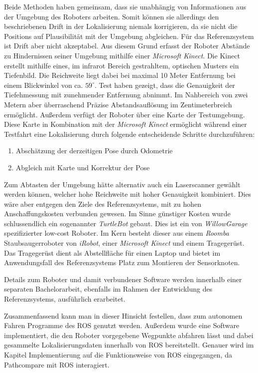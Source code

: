 Beide Methoden haben gemeinsam, dass sie unabhängig von Informationen aus der
Umgebung des Roboters arbeiten. Somit können sie allerdings den beschriebenen
Drift in der Lokalisierung niemals korrigieren, da sie nicht die Positions auf
Plausibilität mit der Umgebung abgleichen.  Für das Referenzsystem ist Drift
aber nicht akzeptabel. Aus diesem Grund erfasst der Roboter Abstände zu
Hindernissen seiner Umgebung mithilfe einer \textit{Microsoft Kinect}. Die
Kinect erstellt mithilfe eines, im infrarot Bereich gestrahltem, optischen
Musters ein Tiefenbild.  Die Reichweite liegt dabei bei maximal 10 Meter
Entfernung bei einem Blickwinkel von ca. $59^{\circ}$.
Test haben gezeigt, dass die Genauigkeit der Tiefehmessung mit zunehmender
Entfernung abnimmt. Im Nahbereich von zwei Metern aber überraschend Präzise
Abstandsauflösung im Zentimeterbreich ermöglicht.  Außerdem verfügt der Roboter
über eine Karte der Testumgebung. Diese Karte in Kombination mit der
\textit{Microsoft Kinect} ermöglicht während einer Testfahrt eine Lokalisierung
durch folgende entscheidende Schritte durchzuführen:

\begin{enumerate}
  \item Abschätzung der derzeitigen Pose durch Odometrie
  \item Abgleich mit Karte und Korrektur der Pose
\end{enumerate}

Zum Abtasten der Umgebung hätte alternativ auch ein Laserscanner gewählt werden
können, welcher hohe Reichweite mit hoher Genauigkeit kombiniert. Dies wäre
aber entgegen den Ziele des Referenzsystems, mit zu hohen Anschaffungskosten
verbunden gewesen. Im Sinne günstiger Kosten wurde schlussendlich ein
sogenannter \textit{TurtleBot} gebaut. Dies ist ein von \textit{WillowGarage}
spezifizierter low-cost Roboter.
Im Kern besteht dieser aus einem \textit{Roomba} Staubsaugerroboter von \textit{iRobot}, 
einer \textit{Microsoft Kinect} und einem Tragegerüst. Das Tragegerüst dient als
Abstellfläche für einen Laptop und bietet im Anwendungsfall des Referenzsystems
Platz zum Montieren der Sensorknoten.

Details zum Roboter und damit verbundener Software werden 
innerhalb einer separaten Bachelorarbeit, ebenfalls im Rahmen der
Entwicklung des Referenzsystems, ausführlich erarbeitet.

Zusammenfassend kann man in dieser Hinsicht festellen, dass zum autonomen Fahren
Programme des \gls{ROS} genutzt werden. Außerdem wurde eine Software implementiert,
die den Roboter vorgegebene Wegpunkte abfahren lässt und dabei gesammelte
Lokalisierungsdaten innerhalb von \gls{ROS} bereitstellt. Genauer wird im
Kapitel Implementierung auf die Funktionsweise von \gls{ROS} eingegangen, da
Pathcompare mit ROS interagiert.

